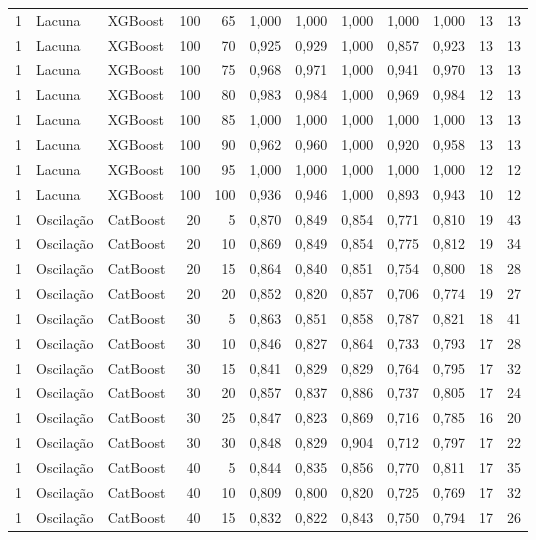 \begin{longtable}{@{}rllrrrrrrrrr@{}}
1 & Lacuna & XGBoost & 100 & 65 & 1,000 & 1,000 & 1,000 & 1,000 & 1,000 & 13 & 13 \\
1 & Lacuna & XGBoost & 100 & 70 & 0,925 & 0,929 & 1,000 & 0,857 & 0,923 & 13 & 13 \\
1 & Lacuna & XGBoost & 100 & 75 & 0,968 & 0,971 & 1,000 & 0,941 & 0,970 & 13 & 13 \\
1 & Lacuna & XGBoost & 100 & 80 & 0,983 & 0,984 & 1,000 & 0,969 & 0,984 & 12 & 13 \\
1 & Lacuna & XGBoost & 100 & 85 & 1,000 & 1,000 & 1,000 & 1,000 & 1,000 & 13 & 13 \\
1 & Lacuna & XGBoost & 100 & 90 & 0,962 & 0,960 & 1,000 & 0,920 & 0,958 & 13 & 13 \\
1 & Lacuna & XGBoost & 100 & 95 & 1,000 & 1,000 & 1,000 & 1,000 & 1,000 & 12 & 12 \\
1 & Lacuna & XGBoost & 100 & 100 & 0,936 & 0,946 & 1,000 & 0,893 & 0,943 & 10 & 12 \\
1 & Oscilação & CatBoost & 20 & 5 & 0,870 & 0,849 & 0,854 & 0,771 & 0,810 & 19 & 43 \\
1 & Oscilação & CatBoost & 20 & 10 & 0,869 & 0,849 & 0,854 & 0,775 & 0,812 & 19 & 34 \\
1 & Oscilação & CatBoost & 20 & 15 & 0,864 & 0,840 & 0,851 & 0,754 & 0,800 & 18 & 28 \\
1 & Oscilação & CatBoost & 20 & 20 & 0,852 & 0,820 & 0,857 & 0,706 & 0,774 & 19 & 27 \\
1 & Oscilação & CatBoost & 30 & 5 & 0,863 & 0,851 & 0,858 & 0,787 & 0,821 & 18 & 41 \\
1 & Oscilação & CatBoost & 30 & 10 & 0,846 & 0,827 & 0,864 & 0,733 & 0,793 & 17 & 28 \\
1 & Oscilação & CatBoost & 30 & 15 & 0,841 & 0,829 & 0,829 & 0,764 & 0,795 & 17 & 32 \\
1 & Oscilação & CatBoost & 30 & 20 & 0,857 & 0,837 & 0,886 & 0,737 & 0,805 & 17 & 24 \\
1 & Oscilação & CatBoost & 30 & 25 & 0,847 & 0,823 & 0,869 & 0,716 & 0,785 & 16 & 20 \\
1 & Oscilação & CatBoost & 30 & 30 & 0,848 & 0,829 & 0,904 & 0,712 & 0,797 & 17 & 22 \\
1 & Oscilação & CatBoost & 40 & 5 & 0,844 & 0,835 & 0,856 & 0,770 & 0,811 & 17 & 35 \\
1 & Oscilação & CatBoost & 40 & 10 & 0,809 & 0,800 & 0,820 & 0,725 & 0,769 & 17 & 32 \\
1 & Oscilação & CatBoost & 40 & 15 & 0,832 & 0,822 & 0,843 & 0,750 & 0,794 & 17 & 26 \\

\end{longtable}
